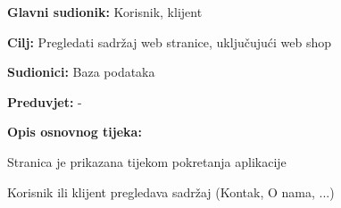 				
					

					\noindent {}
					\begin{packed_item}
	
						\item \textbf{Glavni sudionik: } Korisnik, klijent
						\item  \textbf{Cilj:} Pregledati sadržaj web stranice, uključujući web shop
						\item  \textbf{Sudionici:} Baza podataka
						\item  \textbf{Preduvjet:} -
						\item  \textbf{Opis osnovnog tijeka:}
						
						\item[] \begin{packed_enum}
	
							\item Stranica je prikazana tijekom pokretanja aplikacije
							\item Korisnik ili klijent pregledava sadržaj (Kontak, O nama, ...)
						\end{packed_enum}
						
				
						\end{packed_item}
					
